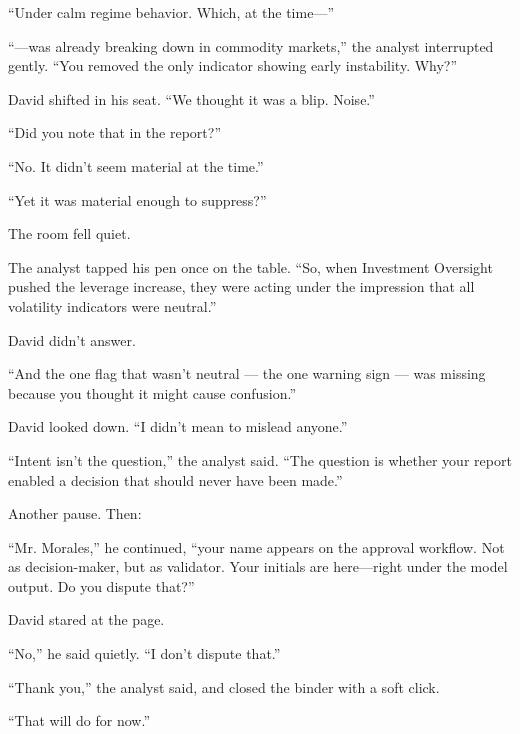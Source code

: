 ``Under calm regime behavior. Which, at the time—''

``—was already breaking down in commodity markets,'' the analyst interrupted gently. ``You removed 
the only indicator showing early instability. Why?''

David shifted in his seat. ``We thought it was a blip. Noise.''

``Did you note that in the report?''

``No. It didn’t seem material at the time.''

``Yet it was material enough to suppress?''

The room fell quiet.

The analyst tapped his pen once on the table. ``So, when Investment Oversight pushed the leverage 
increase, they were acting under the impression that all volatility indicators were neutral.''

David didn’t answer.

``And the one flag that wasn’t neutral — the one warning sign — was missing because you thought 
it might cause confusion.''

David looked down. ``I didn’t mean to mislead anyone.''

``Intent isn't the question,'' the analyst said. ``The question is whether your report enabled 
a decision that should never have been made.''

Another pause. Then:

``Mr. Morales,'' he continued, ``your name appears on the approval workflow. Not as decision-maker, 
but as validator. Your initials are here—right under the model output. Do you dispute that?''

David stared at the page.

``No,'' he said quietly. ``I don’t dispute that.''

``Thank you,'' the analyst said, and closed the binder with a soft click.

``That will do for now.''

\medskip

